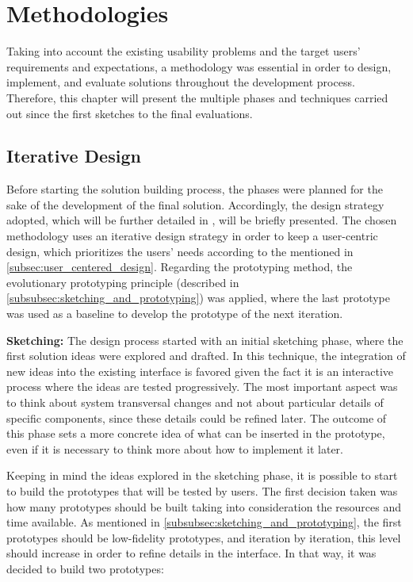 

\chapter{Methodologies}
\label{cha:methodologies}
Taking into account the existing usability problems and the target users' requirements and expectations, a methodology was essential in order to design, implement, and evaluate solutions throughout the development process. Therefore, this chapter will present the multiple phases and techniques carried out since the first sketches to the final evaluations.

\section{Iterative Design}
\label{sec:iterative_design}
Before starting the solution building process, the phases were planned for the sake of the development of the final solution. Accordingly, the design strategy adopted, which will be further detailed in , will be briefly presented. The chosen methodology uses an iterative design strategy in order to keep a user-centric design, which prioritizes the users' needs according to the mentioned in \ref{subsec:user_centered_design}. Regarding the prototyping method, the evolutionary prototyping principle (described in \ref{subsubsec:sketching_and_prototyping}) was applied, where the last prototype was used as a baseline to develop the prototype of the next iteration.

\textbf{Sketching: }The design process started with an initial sketching phase, where the first solution ideas were explored and drafted. In this technique, the integration of new ideas into the existing interface is favored given the fact it is an interactive process where the ideas are tested progressively. The most important aspect was to think about system transversal changes and not about particular details of specific components, since these details could be refined later. The outcome of this phase sets a more concrete idea of what can be inserted in the prototype, even if it is necessary to think more about how to implement it later.

Keeping in mind the ideas explored in the sketching phase, it is possible to start to build the prototypes that will be tested by users. The first decision taken was how many prototypes should be built taking into consideration the resources and time available. As mentioned in \ref{subsubsec:sketching_and_prototyping}, the first prototypes should be low-fidelity prototypes, and iteration by iteration, this level should increase in order to refine details in the interface. In that way, it was decided to build two prototypes:

